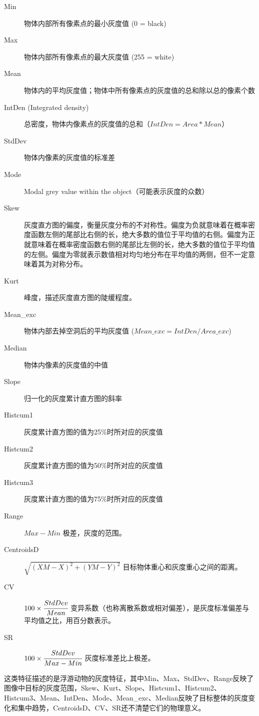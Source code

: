 \begin{description}
    \item[Min] 物体内部所有像素点的最小灰度值 (0 = black)
    \item[Max] 物体内部所有像素点的最大灰度值 (255 = white)
    \item[Mean] 物体内的平均灰度值；物体中所有像素点的灰度值的总和除以总的像素个数
    \item[IntDen (Integrated density)] 总密度，物体内像素点的灰度值的总和（$IntDen = Area * Mean$）
    \item[StdDev] 物体内像素的灰度值的标准差
    \item[Mode] Modal grey value within the object（可能表示灰度的众数）
    \item[Skew] 灰度直方图的偏度，衡量灰度分布的不对称性。偏度为负就意味着在概率密度函数左侧的尾部比右侧的长，绝大多数的值位于平均值的右侧。偏度为正就意味着在概率密度函数右侧的尾部比左侧的长，绝大多数的值位于平均值的左侧。偏度为零就表示数值相对均匀地分布在平均值的两侧，但不一定意味着其为对称分布。
    \item[Kurt] 峰度，描述灰度直方图的陡缓程度。 
    \item[Mean\_exc] 物体内部去掉空洞后的平均灰度值 ($Mean\_exc = IntDen / Area\_exc$)
    \item[Median] 物体内像素的灰度值的中值
    \item[Slope] 归一化的灰度累计直方图的斜率
    \item[Histcum1] 灰度累计直方图的值为25\%时所对应的灰度值
    \item[Histcum2] 灰度累计直方图的值为50\%时所对应的灰度值
    \item[Histcum3] 灰度累计直方图的值为75\%时所对应的灰度值
    \item[Range] $Max-Min$ 极差，灰度的范围。
    \item[CentroidsD] $\sqrt{(XM-X)^{2}+(YM-Y)^{2}}$ 目标物体重心和灰度重心之间的距离。
    \item[CV] $100 \times \cfrac{StdDev}{Mean}$ 变异系数（也称离散系数或相对偏差），是灰度标准偏差与平均值之比，用百分数表示。
    \item[SR] $100 \times \cfrac{StdDev}{Max-Min}$ 灰度标准差比上极差。
\end{description}

这类特征描述的是浮游动物的灰度特征，其中Min、Max、StdDev、Range反映了图像中目标的灰度范围，Skew、Kurt、Slope、Histcum1、Histcum2、Histcum3、Mean、IntDen、Mode、Mean\_exc、Median反映了目标整体的灰度变化和集中趋势，CentroidsD、CV、SR还不清楚它们的物理意义。


